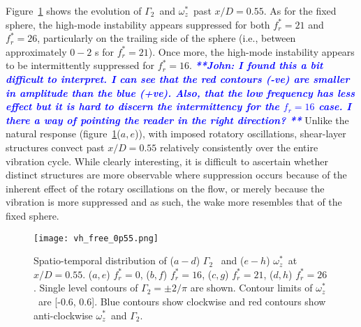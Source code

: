 \documentclass[3p]{elsarticle}
\newcommand{\freqrat}{\ensuremath{f_r^*}}
\newcommand{\gtwo}{\ensuremath{\Gamma_2}}
\newcommand{\wz}{\ensuremath{\omega_z^*}}
\newcommand{\js}[1]{{\textcolor{blue}{{\bf{\it{ **John: #1 **}}}}}}
\begin{document}
Figure~\ref{fig:vh_free_0p55} shows the evolution of \gtwo~and \wz~past $x/D=0.55$. 
As for the fixed sphere, the high-mode instability appears suppressed for both $\freqrat=21$ and $\freqrat=26$, particularly on the trailing side of the sphere (i.e., between approximately $0-2$ s for $\freqrat=21$). 
Once more, the high-mode instability appears to be intermittently suppressed for $\freqrat=16$. 
\js{I found this a bit difficult to interpret. I can see that the red contours (-ve) are smaller in amplitude than the blue (+ve). Also, that the low frequency has less effect but it is hard to discern the intermittency for the $f_r = 16$ case. I there a way of pointing the reader in the right direction?}
Unlike the natural response (figure~\ref{fig:vh_free_0p55}($a,e$)), with imposed rotatory oscillations, shear-layer structures convect past $x/D=0.55$ relatively consistently over the entire vibration cycle. 
While clearly interesting, it is difficult to ascertain whether distinct structures are more observable where suppression occurs because of the inherent effect of the rotary oscillations on the flow, or merely because the vibration is more suppressed and as such, the wake more resembles that of the fixed sphere.
%
\begin{figure}
	\centering
	\texttt{[image: vh\_free\_0p55.png]}
	\caption{Spatio-temporal distribution of ($a-d$) \gtwo~ and
		($e-h$) \wz~at $x/D=0.55$. ($a,e$) $\freqrat=0$, ($b,f$)
		$\freqrat=16$, ($c,g$) $\freqrat=21$, ($d,h$)
		$\freqrat=26$. Single level contours of $\gtwo= \pm 2/\pi$
		are shown. Contour limits of \wz~are [-0.6, 0.6]. Blue contours show clockwise and red contours show anti-clockwise \wz~and \gtwo.}
	\label{fig:vh_free_0p55}
\end{figure}
\end{document}
